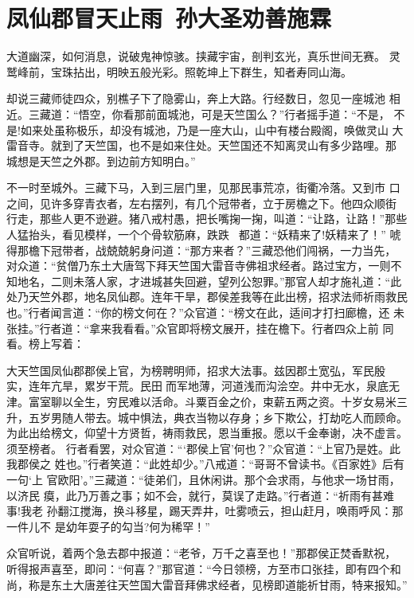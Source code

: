 \chapter{凤仙郡冒天止雨~孙大圣劝善施霖}

大道幽深，如何消息，说破鬼神惊骇。挟藏宇宙，剖判玄光，真乐世间无赛。
灵鹫峰前，宝珠拈出，明映五般光彩。照乾坤上下群生，知者寿同山海。

却说三藏师徒四众，别樵子下了隐雾山，奔上大路。行经数日，忽见一座城池
相近。三藏道：“悟空，你看那前面城池，可是天竺国么？”行者摇手道：“不是，
不是!如来处虽称极乐，却没有城池，乃是一座大山，山中有楼台殿阁，唤做灵山
大雷音寺。就到了天竺国，也不是如来住处。天竺国还不知离灵山有多少路哩。那
城想是天竺之外郡。到边前方知明白。”

不一时至城外。三藏下马，入到三层门里，见那民事荒凉，街衢冷落。又到市
口之间，见许多穿青衣者，左右摆列，有几个冠带者，立于房檐之下。他四众顺街
行走，那些人更不逊避。猪八戒村愚，把长嘴掬一掬，叫道：“让路，让路！”那些
人猛抬头，看见模样，一个个骨软筋麻，跌跌，都道：“妖精来了!妖精来了！”
唬得那檐下冠带者，战兢兢躬身问道：“那方来者？”三藏恐他们闯祸，一力当先，
对众道：“贫僧乃东土大唐驾下拜天竺国大雷音寺佛祖求经者。路过宝方，一则不
知地名，二则未落人家，才进城甚失回避，望列公恕罪。”那官人却才施礼道：“此
处乃天竺外郡，地名凤仙郡。连年干旱，郡侯差我等在此出榜，招求法师祈雨救民
也。”行者闻言道：“你的榜文何在？”众官道：“榜文在此，适间才打扫廊檐，还
未张挂。”行者道：“拿来我看看。”众官即将榜文展开，挂在檐下。行者四众上前
同看。榜上写着：

大天竺国凤仙郡郡侯上官，为榜聘明师，招求大法事。兹因郡土宽弘，军民殷
实，连年亢旱，累岁干荒。民田而军地薄，河道浅而沟浍空。井中无水，泉底无
津。富室聊以全生，穷民难以活命。斗粟百金之价，束薪五两之资。十岁女易米三
升，五岁男随人带去。城中惧法，典衣当物以存身；乡下欺公，打劫吃人而顾命。
为此出给榜文，仰望十方贤哲，祷雨救民，恩当重报。愿以千金奉谢，决不虚言。
须至榜者。
行者看罢，对众官道：“‘郡侯上官’何也？”众官道：“上官乃是姓。此我郡侯之
姓也。”行者笑道：“此姓却少。”八戒道：“哥哥不曾读书。《百家姓》后有一句‘上
官欧阳’。”三藏道：“徒弟们，且休闲讲。那个会求雨，与他求一场甘雨，以济民
瘼，此乃万善之事；如不会，就行，莫误了走路。”行者道：“祈雨有甚难事!我老
孙翻江搅海，换斗移星，踢天弄井，吐雾喷云，担山赶月，唤雨呼风：那一件儿不
是幼年耍子的勾当?何为稀罕！”

众官听说，着两个急去郡中报道：“老爷，万千之喜至也！”那郡侯正焚香默祝，
听得报声喜至，即问：“何喜？”那官道：“今日领榜，方至市口张挂，即有四个和
尚，称是东土大唐差往天竺国大雷音拜佛求经者，见榜即道能祈甘雨，特来报知。”


